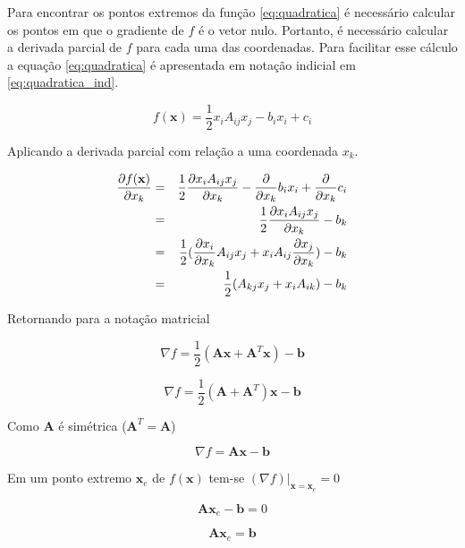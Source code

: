 Para encontrar os pontos extremos da função \eqref{eq:quadratica} é necessário calcular os pontos em que o gradiente de $f$ é o vetor nulo. Portanto, é necessário calcular a derivada parcial de $f$ para cada uma das coordenadas. Para facilitar esse cálculo a equação \eqref{eq:quadratica} é apresentada em notação indicial em \eqref{eq:quadratica_ind}.


\begin{equation} \label{eq:quadratica_ind}
    f(\mathbf{x}) = \frac{1}{2} x_i A_{ij} x_j - b_i x_i + c_i
\end{equation}


Aplicando a derivada parcial com relação a uma coordenada $x_k$.


\begin{eqnarray}
     \dxk[f(\mathbf{x})] & = & \frac{1}{2} \dxk[ x_i A_{ij} x_j ]- \dxk{b_i x_i}+ \dxk{c_i} \\
                & = & \frac{1}{2} \dxk[ x_i A_{ij} x_j ]- b_k \\
                & = & \frac{1}{2} (\dxk[ x_i ]A_{ij} x_j  + x_i A_{ij} \dxk[x_j]) - b_k \\
                & = & \frac{1}{2}(A_{kj} x_j  + x_i A_{ik})  - b_k
\end{eqnarray}


Retornando para a notação matricial


\begin{equation}
    \nabla f = \frac{1}{2} (\mathbf{A}\mathbf{x} + \mathbf{A}^T \mathbf{x}) - \mathbf{b}
\end{equation}


\begin{equation}
    \nabla f = \frac{1}{2} (\mathbf{A} + \mathbf{A}^T) \mathbf{x} - \mathbf{b}
\end{equation}

Como $\mathbf{A}$ é simétrica ($\mathbf{A}^T = \mathbf{A}$)

\begin{equation} \label{eq:gradf}
    \nabla f = \mathbf{A} \mathbf{x} - \mathbf{b}
\end{equation}

Em um ponto extremo  $ \mathbf{x}_e$ de $f(\mathbf{x})$ tem-se $(\nabla f)|_{\mathbf{x}=\mathbf{x}_e} = 0 $

\begin{equation}
    \mathbf{A}\mathbf{x}_e - \mathbf{b} = 0
\end{equation}

\begin{equation}
    \mathbf{A}\mathbf{x}_e = \mathbf{b}
\end{equation}

